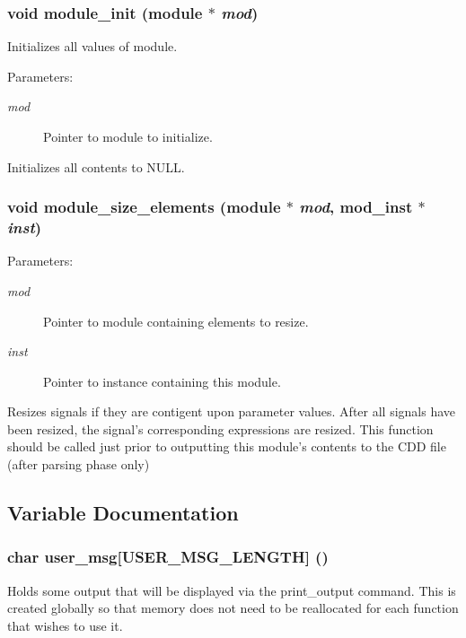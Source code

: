 \subsubsection{\setlength{\rightskip}{0pt plus 5cm}void module\_\-init ({\bf module} $\ast$ {\em mod})}\label{module_8c_a1}


Initializes all values of module. 

\begin{Desc}
\item[Parameters:]
\begin{description}
\item[{\em mod}]Pointer to module to initialize.\end{description}
\end{Desc}
Initializes all contents to NULL. 
\subsubsection{\setlength{\rightskip}{0pt plus 5cm}void module\_\-size\_\-elements ({\bf module} $\ast$ {\em mod}, {\bf mod\_\-inst} $\ast$ {\em inst})}\label{module_8c_a3}


\begin{Desc}
\item[Parameters:]
\begin{description}
\item[{\em mod}]Pointer to module containing elements to resize. \item[{\em inst}]Pointer to instance containing this module.\end{description}
\end{Desc}
Resizes signals if they are contigent upon parameter values. After all signals have been resized, the signal's corresponding expressions are resized. This function should be called just prior to outputting this module's contents to the CDD file (after parsing phase only) 

\subsection{Variable Documentation}
\subsubsection{\setlength{\rightskip}{0pt plus 5cm}char {\bf user\_\-msg}[USER\_\-MSG\_\-LENGTH] ()}\label{module_8c_a0}


Holds some output that will be displayed via the print\_\-output command. This is created globally so that memory does not need to be reallocated for each function that wishes to use it. 